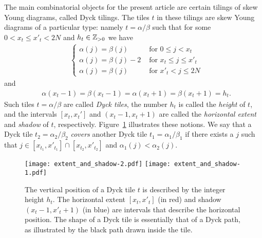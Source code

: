 \documentclass[oneside,english]{amsart}
\numberwithin{equation}{section}
\numberwithin{figure}{section}
\theoremstyle{plain}
\theoremstyle{plain}
\theoremstyle{plain}
\theoremstyle{remark}
\theoremstyle{plain}
\theoremstyle{plain}
\theoremstyle{plain}
\theoremstyle{plain}
\theoremstyle{plain}
\theoremstyle{plain}
\theoremstyle{plain}
\theoremstyle{plain}
\newcommand{\blue}[1]{{\color{blue} #1}}
\begin{document}
The main combinatorial objects for the present article are certain tilings of
skew Young diagrams,
called Dyck tilings.
The tiles $t$ in these tilings are skew Young diagrams of a particular
type: namely $t = \alpha/\beta$ such that for some $0 < x_t \leq x'_t < 2N$
and $h_t \in \mathbb{Z}_{> 0}$ we have
\begin{align*}
& \begin{cases}
\alpha(j) = \beta(j) & \text{ for } 0 \leq j < x_t \\
\alpha(j) = \beta(j) -2 & \text{ for } x_t \leq j \leq x'_t \\
\alpha(j) = \beta(j) & \text{ for } x'_t < j \leq 2N 
\end{cases}
\end{align*}
and
\begin{align*}
& \alpha(x_t-1) = \beta(x_t-1) = \alpha(x_t+1) = \beta(x_t+1) = h_t .
\end{align*}
Such tiles $t=\alpha/\beta$ are called \emph{Dyck tiles}, the number $h_t$
is called the \emph{height} of $t$, and the intervals $[x_t , x_t']$
and $(x_t-1, x_t+1)$ are called the \emph{horizontal extent} and \emph{shadow} of $t$,
respectively. Figure~\ref{fig: extent shadow and height} illustrates these notions.
We say that a Dyck tile $t_2 = \alpha_2 / \beta_2$ \emph{covers} another Dyck
tile $t_1 = \alpha_1 / \beta_1$ if there exists a $j$ such that
$j \in [x_{t_1} , x'_{t_1}] \cap [x_{t_2} , x'_{t_2}]$ and $\alpha_1(j) < \alpha_2(j)$.
\begin{figure}[h!]
\texttt{[image: extent\_and\_shadow-2.pdf]} \hspace{1cm}
\texttt{[image: extent\_and\_shadow-1.pdf]}
\caption{\label{fig: extent shadow and height} The vertical position of a
Dyck tile $t$ is described by the integer height $h_t$.
The horizontal extent $[x_t , x'_t]$ (in red) and shadow $(x_t-1 , x'_t +1)$
(in blue) are intervals that describe the 
horizontal position.
The shape of a Dyck tile is essentially that of a %
Dyck path, as illustrated by the black path drawn inside the tile.
}
\end{figure}
\end{document}
